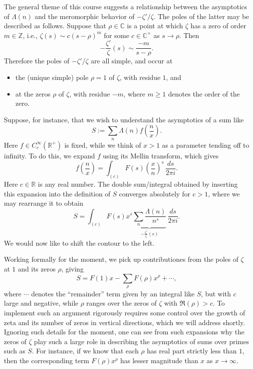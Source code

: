 \documentclass[reqno]{amsart}  \numberwithin{theorem}{section} \numberwithin{equation}{section}
\begin{document}
The general theme of this course suggests a relationship between the asymptotics of $\Lambda(n)$ and the meromorphic behavior of $- \zeta ' / \zeta$.  The poles of the latter may be described as follows.  Suppose that $\rho \in \mathbb{C}$ is a point at which $\zeta$ has a zero of order $m \in \mathbb{Z}$, i.e., $\zeta(s) \sim c (s - \rho)^m$ for some $c \in \mathbb{C}^\times$ as $s \rightarrow \rho$.  Then
\begin{equation*}
- \frac{\zeta'}{\zeta}(s) \sim \frac{- m }{s - \rho}.
\end{equation*}
Therefore the poles of $- \zeta ' / \zeta $ are all simple, and occur at
\begin{itemize}
\item the (unique simple) pole $\rho = 1$ of $\zeta$, with residue $1$, and
\item at the zeros $\rho$ of $\zeta$, with residue $-m$, where $m \geq 1$ denotes the order of the zero.
\end{itemize}

Suppose, for instance, that we wish to understand the asymptotics of a sum like
\begin{equation*}
S := \sum_n \Lambda (n) f \left( \frac{n}{x} \right).
\end{equation*}
Here $f \in C_c^\infty (\mathbb{R}^+ )$ is fixed, while we think of $x > 1$ as a parameter tending off to infinity.  To do this, we expand $f$ using its Mellin transform, which gives
\begin{equation*}
f \left( \frac{n}{x} \right) = \int_{(c)} F (s) \left( \frac{x}{n} \right)^s \, \frac{d s}{2 \pi i}.
\end{equation*}
Here $c \in \mathbb{R}$ is any real number.  The double sum/integral obtained by inserting this expansion into the definition of $S$ converges absolutely for $c > 1$, where we may rearrange it to obtain
\begin{equation*}
S = \int_{(c)} F (s) x^s \underbrace
{
  \sum_n 
\frac{\Lambda (n)}{ n^s } 
}_{
  - \frac{\zeta ' }{\zeta }(s)
}\, \frac{d s}{2 \pi i}.
\end{equation*}
We would now like to shift the contour to the left.

Working formally for the moment, we pick up contributiones from the poles of $\zeta$ at $1$ and its zeros $\rho$, giving
\begin{equation*}
  S =
  F(1) x
  -
  \sum_{\rho}
  F(\rho) x^\rho
  +
  \dotsb,
\end{equation*}
where $\dotsb$ denotes the ``remainder'' term given by an integral like $S$, but with $c$ large and negative, while $\rho$ ranges over the zeros of $\zeta$ with $\Re(\rho) > c$.  To implement such an argument rigorously requires some control over the growth of zeta and its number of zeros in vertical directions, which we will address shortly.  Ignoring such details for the moment, one can see from such expansions why the zeros of $\zeta$ play such a large role in describing the asymptotics of sums over primes such as $S$.  For instance, if we know that each $\rho$ has real part strictly less than $1$, then the corresponding term $F(\rho) x^\rho$ has lesser magnitude than $x$ as $x \rightarrow \infty$.
\end{document}
